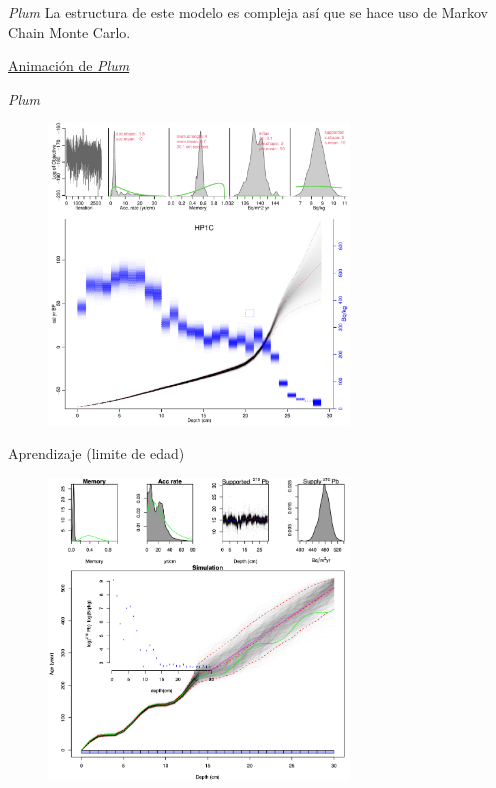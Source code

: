 \documentclass{beamer}
\begin{document}
\begin{frame}{\textit{Plum} }
	La estructura de este modelo es compleja así que se hace uso de Markov Chain Monte Carlo.

	\href{https://www.researchgate.net/project/Plum-package}{Animación de \textit{Plum}}
\end{frame} 

\begin{frame}{\textit{Plum} }
		\begin{figure}
			\begin{centering}
				\includegraphics[width=8cm]{./Figures/HP1C_30.pdf}
				\caption{}
				\label{}
			\end{centering}
		\end{figure}
\end{frame} 

\begin{frame}{Aprendizaje (limite de edad)}
	\begin{figure}
		\begin{centering}
			\includegraphics[width=8cm]{./Figures/Absurde_age_lim.png}
			\caption{}
			\label{}
		\end{centering}
	\end{figure}
\end{frame} 
\end{document}
